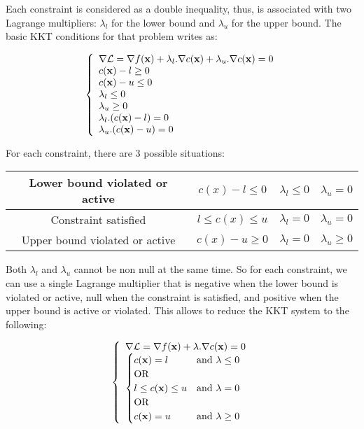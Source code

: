 Each constraint is considered as a double inequality, thus, is associated with two Lagrange multipliers: $\lambda_l$ for the lower bound and $\lambda_u$ for the upper bound.
The basic KKT conditions for that problem writes as:

\begin{equation}
\label{KKT}
\left\{
\begin{array}{lr}
  \nabla \mathcal{L} = \nabla f({\bf x}) + \lambda_l.\nabla c({\bf x}) + \lambda_u.\nabla
c({\bf x}) = 0 \\
  c({\bf x}) - l \geq 0 \\
  c({\bf x}) - u \leq 0 \\
  \lambda_l \leq 0 \\
  \lambda_u \geq 0 \\
  \lambda_l.(c({\bf x})-l) = 0 \\
  \lambda_u.(c({\bf x})-u) = 0
\end{array}
\right.
\end{equation}

For each constraint, there are 3 possible situations:

\begin{tabular}{cccc}
  \toprule
  Lower bound violated or active & $c(x)-l\leq0$ & $\lambda_l\leq0$ & $\lambda_u=0$ \\
  \midrule
  Constraint satisfied & $l\leq c(x) \leq u$ & $\lambda_l=0$ & $\lambda_u=0$ \\
  \midrule
  Upper bound violated or active & $c(x)-u\geq0$ & $\lambda_l=0$ & $\lambda_u\geq0$ \\
  \bottomrule
\end{tabular}

Both $\lambda_l$ and $\lambda_u$ cannot be non null at the same time. So for each constraint, we can use a single Lagrange multiplier that is negative when the lower bound is violated or active, null when the constraint is satisfied, and positive when the upper bound is active or violated.
This allows to reduce the KKT system to the following:

\begin{equation}
\label{KKTmodified}
\left\{
\begin{array}{lr}
  \nabla \mathcal{L} = \nabla f({\bf x}) + \lambda.\nabla c({\bf x}) = 0 \\
  \begin{cases}
  c({\bf x}) = l & \text{and } \lambda \leq 0 \\
  \text{OR}\\
  l \leq c({\bf x}) \leq u & \text{and } \lambda = 0 \\
  \text{OR}\\
  c({\bf x}) = u & \text{and } \lambda \geq 0
  \end{cases}
\end{array}
\right.
\end{equation}

